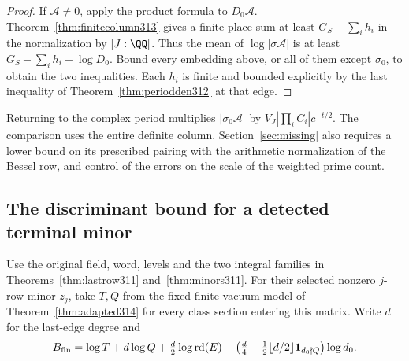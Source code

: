 \documentclass[a4paper,11pt]{article}
\theoremstyle{definition}
\theoremstyle{remark}
\numberwithin{equation}{section}
\begin{document}
\begin{proof}
If \(\mathcal A\ne0\), apply the product formula to \(D_0\mathcal A\).
Theorem~\ref{thm:finitecolumn313} gives a finite-place sum at least
\(G_S-\sum_i h_i\) in the normalization by \([J:\QQ]\).
Thus the mean of \(\log|\sigma\mathcal A|\) is at least
\(G_S-\sum_i h_i-\log D_0\). Bound every embedding above, or all
of them except \(\sigma_0\), to obtain the two inequalities.
Each \(h_i\) is finite and bounded explicitly by the last
inequality of Theorem~\ref{thm:periodden312} at that edge.
\end{proof}

Returning to the complex period multiplies
\(|\sigma_0\mathcal A|\) by \(V_J|\prod_i C_i|c^{-t/2}\).
The comparison uses the entire definite column. Section~\ref{sec:missing}
also requires a lower bound on its prescribed pairing with the
arithmetic normalization of the Bessel row, and control of the
errors on the scale of the weighted prime count.

\subsection{The discriminant bound for a detected terminal minor}\label{nav:I-78}
Use the original field, word, levels and the two integral families
in Theorems~\ref{thm:lastrow311} and~\ref{thm:minors311}.
For their selected nonzero \(j\)-row minor \(z_j\), take \(T,Q\)
from the fixed finite vacuum model of Theorem~\ref{thm:adapted314}
for every class section entering this matrix. Write \(d\) for
the last-edge degree and
\[
 B_{\rm fin}=\log T+d\log Q+\tfrac d2\log\operatorname{rd}(E)
 -\left(\tfrac d4-\tfrac12\lfloor d/2\rfloor
                    \mathbf1_{d_0\nmid Q}\right)\log d_0 .
\]
\end{document}
